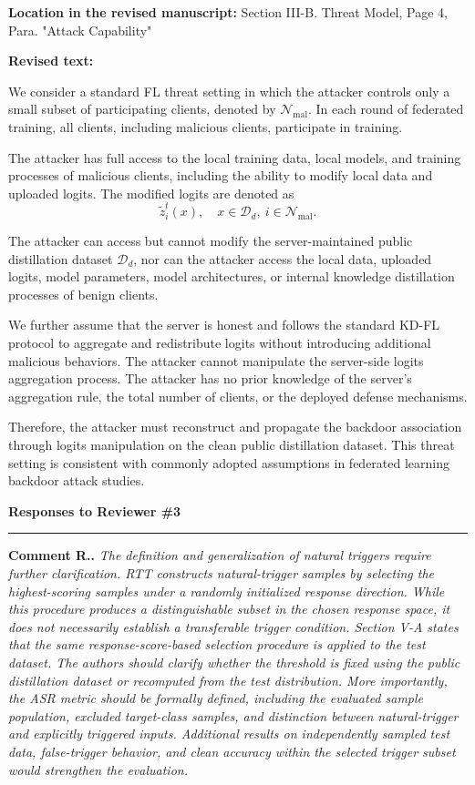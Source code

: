 \documentclass[11pt,a4paper]{article}
\newcommand{\manualindent}{\par\noindent\hspace*{1.5em}\ignorespaces}
\newcounter{reviewernum}
\newcounter{commentnum}
\newcommand{\reviewersection}[1]{%
  \clearpage
  \setcounter{reviewernum}{#1}%
  \setcounter{commentnum}{0}%
  \vspace{0.7em}%
  {\Large\bfseries\color{headingnavy}\hypertarget{reviewer:#1}{Responses to Reviewer \##1}\par}%
  \vspace{0.25em}\hrule\vspace{0.85em}%
}
\newcommand{\reviewcomment}[1]{%
  \stepcounter{commentnum}%
  \begin{tcolorbox}[
      enhanced,breakable,colback=black!3,colframe=black!20,
      boxrule=0.5pt,arc=1.2mm,left=9pt,right=9pt,top=8pt,bottom=8pt]
    {\bfseries Comment R\arabic{reviewernum}.\arabic{commentnum}.}\quad
    {\itshape #1}
  \end{tcolorbox}%
}
\newcommand{\revisedtext}[2]{%
  {\bfseries\color{headingnavy}Location in the revised manuscript:} #1\par
  \begin{tcolorbox}[
      enhanced,breakable,colback=replyblue!3,colframe=replyblue!18,
      before upper={\setlength{\parskip}{6pt}},
      borderline west={2.5pt}{0pt}{replyblue},
      boxrule=0.5pt,arc=1mm,left=11pt,right=9pt,top=8pt,bottom=8pt]
    {\bfseries\color{headingnavy}Revised text:}\par
    #2
  \end{tcolorbox}
  \vspace{0.35em}%
}
\begin{document}
\revisedtext{Section III-B. Threat Model, Page 4, Para. "Attack Capability"}{\manualindent We consider a standard FL threat setting in which the attacker controls only a small subset of participating clients, denoted by $\mathcal{N}_\mathrm{mal}$.
In each round of federated training, all clients, including malicious clients, participate in training.

\manualindent The attacker has full access to the local training data, local models, and training processes of malicious clients, including the ability to modify local data and uploaded logits.
The modified logits are denoted as
\begin{equation}
\widetilde{z}_i^t(x),\quad x\in\mathcal{D}_d,\ i\in\mathcal{N}_\mathrm{mal}.
\label{eq}
\tag{7}
\end{equation}

The attacker can access but cannot modify the server-maintained public distillation dataset $\mathcal{D}_d$, nor can the attacker access the local data, uploaded logits, model parameters, model architectures, or internal knowledge distillation processes of benign clients.

\manualindent We further assume that the server is honest and follows the standard KD-FL protocol to aggregate and redistribute logits without introducing additional malicious behaviors.
The attacker cannot manipulate the server-side logits aggregation process.
The attacker has no prior knowledge of the server's aggregation rule, the total number of clients, or the deployed defense mechanisms.

\manualindent Therefore, the attacker must reconstruct and propagate the backdoor association through logits manipulation on the clean public distillation dataset.
This threat setting is consistent with commonly adopted assumptions in federated learning backdoor attack studies.}



\reviewersection{3}

\reviewcomment{The definition and generalization of natural triggers require further clarification.
RTT constructs natural-trigger samples by selecting the highest-scoring samples under a randomly initialized response direction. 
While this procedure produces a distinguishable subset in the chosen response space, it does not necessarily establish a transferable trigger condition. 
Section V-A states that the same response-score-based selection procedure is applied to the test dataset. The authors should clarify whether the threshold is fixed using the public distillation dataset or recomputed from the test distribution. 
More importantly, the ASR metric should be formally defined, including the evaluated sample population, excluded target-class samples, and distinction between natural-trigger and explicitly triggered inputs. 
Additional results on independently sampled test data, false-trigger behavior, and clean accuracy within the selected trigger subset would strengthen the evaluation.}
\end{document}
